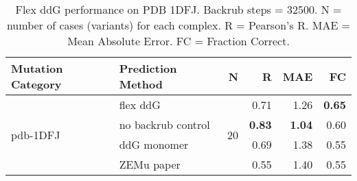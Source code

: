 \begin{table}
  \begin{tabular}{llrrrr}
\toprule
Mutation Category &   Prediction Method &   N &    R &  MAE &   FC \\
\midrule
 \multirow{ 4}{*}{pdb-1DFJ} & flex ddG & \multirow{ 4}{*}{20} & 0.71 & 1.26 & \textbf{0.65}  \\
 & no backrub control & & \textbf{0.83} & \textbf{1.04} & 0.60  \\
 & ddG monomer & & 0.69 & 1.38 & 0.55  \\
 & ZEMu paper & & 0.55 & 1.40 & 0.55  \\
\bottomrule
\end{tabular}
  \caption[Flex ddG performance on PDB 1DFJ]{
    Flex ddG performance on PDB 1DFJ. Backrub steps = 32500. N = number of cases (variants) for each complex. R = Pearson's R. MAE = Mean Absolute Error. FC = Fraction Correct.
  } \label{tab:table-pdb-1DFJ}
\end{table}
